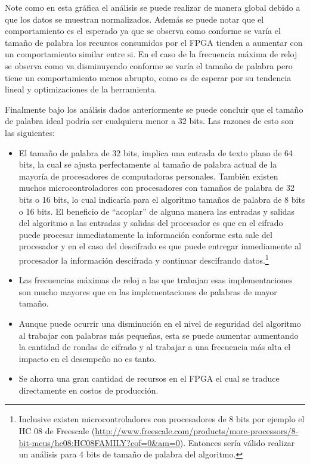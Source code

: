 Note como en esta gráfica el análisis se puede realizar de manera global debido a que los datos se muestran normalizados. Además se puede notar que el comportamiento es el esperado ya que se observa como conforme se varía el tamaño de palabra los recursos consumidos por el FPGA tienden a aumentar con un comportamiento similar entre si. En el caso de la frecuencia máxima de reloj se observa como va disminuyendo conforme se varía el tamaño de palabra pero tiene un comportamiento menos abrupto, como es de esperar por su tendencia lineal y optimizaciones de la herramienta. 

Finalmente bajo los análisis dados anteriormente se puede concluir que el tamaño de palabra ideal podría ser cualquiera menor a 32 bits. Las razones de esto son las siguientes:

\begin{itemize}
\item El tamaño de palabra de 32 bits, implica una entrada de texto plano de 64 bits, la cual se ajusta perfectamente al tamaño de palabra actual de la mayoría de procesadores de computadoras personales. También existen muchos microcontroladores con procesadores con tamaños de palabra de 32 bits o 16 bits, lo cual indicaría para el algoritmo tamaños de palabra de 8 bits o 16 bits. El beneficio de ``acoplar'' de alguna manera las entradas y salidas del algoritmo a las entradas y salidas del procesador es que en el cifrado puede procesar inmediatamente la información conforme esta sale del procesador y en el caso del descifrado es que puede entregar inmediamente al procesador la información descifrada y continuar descifrando datos.\footnote{Inclusive existen microcontroladores con procesadores de 8 bits por ejemplo el HC 08 de Freescale (\url{http://www.freescale.com/products/more-processors/8-bit-mcus/hc08:HC08FAMILY?cof=0&am=0}). Entonces sería válido realizar un análisis para 4 bits de tamaño de palabra del algoritmo.}

\item Las frecuencias máximas de reloj a las que trabajan esas implementaciones son mucho mayores que en las implementaciones de palabras de mayor tamaño.

\item Aunque puede ocurrir una disminución en el nivel de seguridad del algoritmo al trabajar con palabras más pequeñas, esta se puede aumentar aumentando la cantidad de rondas de cifrado y al trabajar a una frecuencia más alta el impacto en el desempeño no es tanto.

\item Se ahorra una gran cantidad de recursos en el FPGA el cual se traduce directamente en costos de producción.
\end{itemize}


